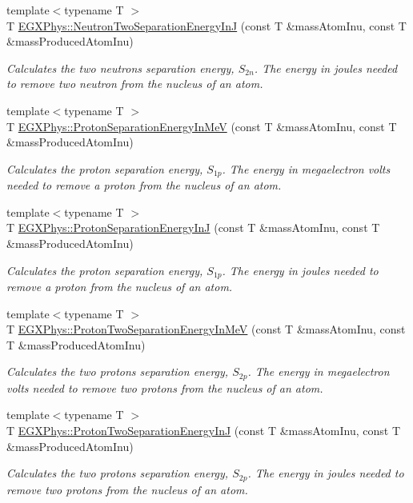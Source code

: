 \begin{DoxyCompactItemize}
{\footnotesize template$<$typename T $>$ }\\T \mbox{\hyperlink{group___nuclear_separation_energy_ga293ac9428420a0adf4235048dbe529b4}{E\+G\+X\+Phys\+::\+Neutron\+Two\+Separation\+Energy\+InJ}} (const T \&mass\+Atom\+Inu, const T \&mass\+Produced\+Atom\+Inu)
\begin{DoxyCompactList}\small\item\em Calculates the two neutrons separation energy, $S_{2n}$. The energy in joules needed to remove two neutron from the nucleus of an atom. \end{DoxyCompactList}\item 
{\footnotesize template$<$typename T $>$ }\\T \mbox{\hyperlink{group___nuclear_separation_energy_ga6a619ded55c47ed22ea2d8a85202ebeb}{E\+G\+X\+Phys\+::\+Proton\+Separation\+Energy\+In\+MeV}} (const T \&mass\+Atom\+Inu, const T \&mass\+Produced\+Atom\+Inu)
\begin{DoxyCompactList}\small\item\em Calculates the proton separation energy, $S_{1p}$. The energy in megaelectron volts needed to remove a proton from the nucleus of an atom. \end{DoxyCompactList}\item 
{\footnotesize template$<$typename T $>$ }\\T \mbox{\hyperlink{group___nuclear_separation_energy_ga4274d8f5a3860169fd81970707eb582a}{E\+G\+X\+Phys\+::\+Proton\+Separation\+Energy\+InJ}} (const T \&mass\+Atom\+Inu, const T \&mass\+Produced\+Atom\+Inu)
\begin{DoxyCompactList}\small\item\em Calculates the proton separation energy, $S_{1p}$. The energy in joules needed to remove a proton from the nucleus of an atom. \end{DoxyCompactList}\item 
{\footnotesize template$<$typename T $>$ }\\T \mbox{\hyperlink{group___nuclear_separation_energy_ga0de42783a7c650eb32f85dc2d40d84d7}{E\+G\+X\+Phys\+::\+Proton\+Two\+Separation\+Energy\+In\+MeV}} (const T \&mass\+Atom\+Inu, const T \&mass\+Produced\+Atom\+Inu)
\begin{DoxyCompactList}\small\item\em Calculates the two protons separation energy, $S_{2p}$. The energy in megaelectron volts needed to remove two protons from the nucleus of an atom. \end{DoxyCompactList}\item 
{\footnotesize template$<$typename T $>$ }\\T \mbox{\hyperlink{group___nuclear_separation_energy_gad7c1d4a32daa8aaa53c5fce37c421f82}{E\+G\+X\+Phys\+::\+Proton\+Two\+Separation\+Energy\+InJ}} (const T \&mass\+Atom\+Inu, const T \&mass\+Produced\+Atom\+Inu)
\begin{DoxyCompactList}\small\item\em Calculates the two protons separation energy, $S_{2p}$. The energy in joules needed to remove two protons from the nucleus of an atom. \end{DoxyCompactList}\end{DoxyCompactItemize}



